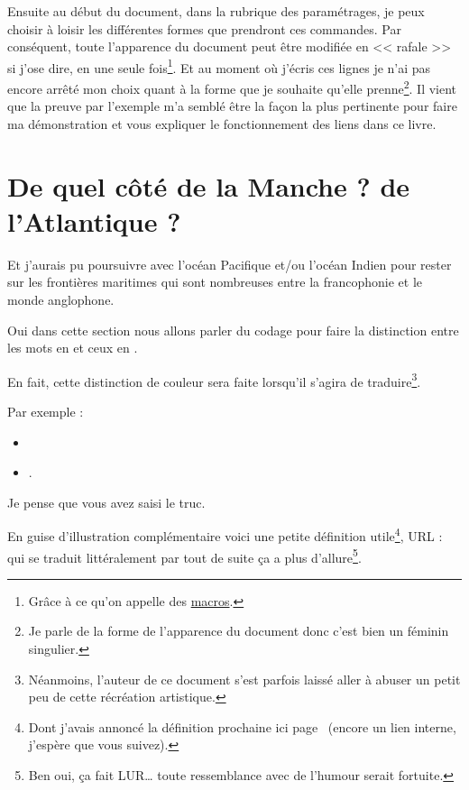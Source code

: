 Ensuite au début du document, dans la rubrique des paramétrages, je
peux choisir à loisir les différentes formes que prendront ces
commandes. Par conséquent, toute l'apparence du document peut être
modifiée en << rafale >> si j'ose dire, en une seule
fois\footnote{Grâce à ce qu'on appelle des \href{http://www.tuteurs.ens.fr/logiciels/latex/macros.html}{macros}.}. Et au
moment où j'écris ces lignes je n'ai pas encore arrêté mon choix quant
à la forme que je souhaite qu'elle prenne\footnote{Je parle de la
  forme de l'apparence du document donc c'est bien un féminin
  singulier.}. Il vient que la preuve par l'exemple m'a semblé être la
façon la plus pertinente pour faire ma démonstration et vous expliquer le fonctionnement des liens dans ce livre.

\newpage

\section{De quel côté de la Manche ? de l'Atlantique ?}\label{sec:side}

Et j'aurais pu poursuivre avec l'océan Pacifique et/ou l'océan Indien
pour rester sur les frontières maritimes qui sont nombreuses entre la
francophonie et le monde anglophone.

Oui dans cette section nous allons parler du codage pour faire la
distinction entre les mots en  et ceux en .

En fait, cette distinction de couleur sera faite lorsqu'il s'agira de
traduire\footnote{Néanmoins, l'auteur de ce document s'est parfois 
  laissé aller à abuser un petit peu de cette récréation artistique.}.

Par exemple :
\begin{itemize}
\item {}
\item {}.  
\end{itemize}

Je pense que vous avez saisi le truc.

En guise d'illustration complémentaire voici une petite définition
utile\footnote{Dont j'avais annoncé la définition prochaine ici
  page~\pageref{sec:link} (encore un lien interne, j'espère que vous
  suivez).}, URL :  qui se traduit
littéralement par  tout de
suite ça a plus d'allure\footnote{Ben oui, ça fait LUR\dots\xspace toute
  ressemblance avec de l'humour serait fortuite.}.

